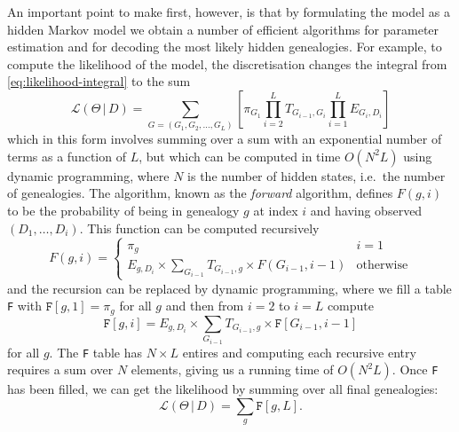 \documentclass[graybox]{svmult}
\newcommand{\G}{\ensuremath{G}}
\renewcommand{\D}{\ensuremath{D}}
\renewcommand{\lhd}{\ensuremath{\mathcal{L}}}
\newcommand{\T}{\ensuremath{T}}
\renewcommand{\E}{\ensuremath{E}}
\begin{document}
An important point to make first, however, is that by formulating the model as a hidden Markov model we obtain a number of efficient algorithms for parameter estimation and for decoding the most likely hidden genealogies. For example, to compute the likelihood of the model, the discretisation changes the integral from \eqref{eq:likelihood-integral} to the sum
\begin{equation}
  \label{eq:likelhood-sum}
  \lhd(\Theta\,|\,\D) = 
  \sum_{\G=(\G_1,\G_2,\ldots,\G_L)} 
  	\left[
   	  \pi_{\G_1}
  	  \prod_{i=2}^{L}\T_{\G_{i-1},\G_{i}}
  	  \prod_{i=1}^L  \E_{\G_i,\D_i}
  	\right]
\end{equation}
which in this form involves summing over a sum with an exponential number of terms as a function of $L$, but which can be computed in time $O(N^2L)$ using dynamic programming, where $N$ is the number of hidden states, i.e.\ the number of genealogies. The algorithm, known as the \emph{forward} algorithm, defines $F(g,i)$ to be the probability of being in genealogy $g$ at index $i$ and having observed $(\D_1,\ldots,\D_i)$. This function can be computed recursively
\begin{equation}
  F(g,i) = 
  \begin{cases}
  	\pi_g & i = 1 \\
  	\E_{g,\D_i} \times \sum_{\G_{i-1}}\T_{\G_{i-1},g} \times F(\G_{i-1},i-1)
  	& \mathrm{otherwise}
  \end{cases}
\end{equation}
and the recursion can be replaced by dynamic programming, where we fill a table \texttt{F} with $\mathtt{F}[g,1] = \pi_g$ for all $g$ and then from $i=2$ to $i=L$ compute
\[
\mathtt{F}[g,i] = \E_{g,\D_i} \times \sum_{\G_{i-1}}\T_{\G_{i-1},g} \times \mathtt{F}[\G_{i-1},i-1]
\]
for all $g$. The \texttt{F} table has $N\times L$ entires and computing each recursive entry requires a sum over $N$ elements, giving us a running time of $O(N^2L)$. Once \texttt{F} has been filled, we can get the likelihood by summing over all final genealogies:
\begin{equation}
  \lhd(\Theta\,|\,\D) = \sum_{g} \mathtt{F}[g,L].
\end{equation}
\end{document}

